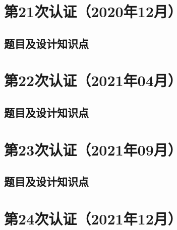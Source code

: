 \documentclass[cn,10pt,math=newtx,citestyle=gb7714-2015,bibstyle=gb7714-2015]{elegantbook}
\begin{document}


\chapter{第21次认证（2020年12月）}

\section{题目及设计知识点}











\chapter{第22次认证（2021年04月）}

\section{题目及设计知识点}











\chapter{第23次认证（2021年09月）}

\section{题目及设计知识点}











\chapter{第24次认证（2021年12月）}
\end{document}
